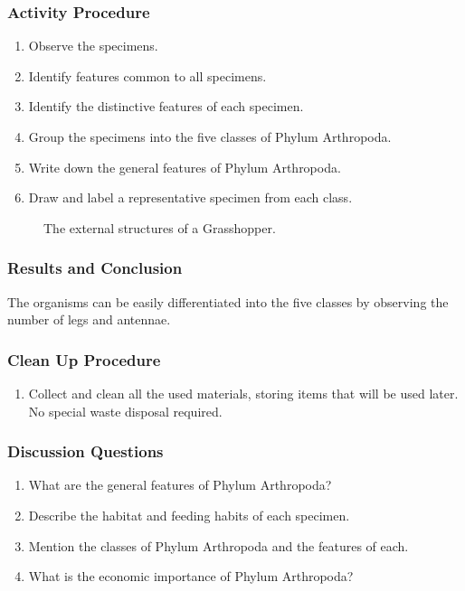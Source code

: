 \subsubsection*{Activity Procedure}
\begin{enumerate}
\item{Observe the specimens.}
\item{Identify features common to all specimens.}
\item{Identify the distinctive features of each specimen.}
\item{Group the specimens into the five classes of Phylum Arthropoda.}
\item{Write down the general features of Phylum Arthropoda.}
\item{Draw and label a representative specimen from each class.}
\end{enumerate}

\begin{figure}[h]
\begin{center}
\def\svgwidth{12cm}

\caption{The external structures of a Grasshopper.}
\label{fig:fish}
\end{center}
\end{figure}

\subsubsection*{Results and Conclusion}
The organisms can be easily differentiated into the five classes by observing the number of legs and antennae. 

\subsubsection*{Clean Up Procedure}
\begin{enumerate}
\item{Collect and clean all the used materials, storing items that will be used later. No special waste disposal required.}
\end{enumerate}

\subsubsection*{Discussion Questions}
\begin{enumerate}
\item{What are the general features of Phylum Arthropoda?}
\item{Describe the habitat and feeding habits of each specimen.}
\item{Mention the classes of Phylum Arthropoda and the features of each.}
\item{What is the economic importance of Phylum Arthropoda?}
\end{enumerate}



